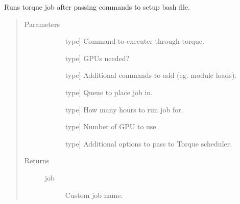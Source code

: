 \documentclass[letterpaper,10pt,english]{sphinxmanual}
\begin{document}

\begin{fulllineitems}
\label{\detokenize{index:methylnet.torque_jobs.assemble_run_torque}}
Runs torque job after passing commands to setup bash file.
\begin{quote}\begin{description}
\item[{Parameters}] \leavevmode\begin{description}
\item[{}] \leavevmode{[}type{]}
Command to executer through torque.

\item[{}] \leavevmode{[}type{]}
GPUs needed?

\item[{}] \leavevmode{[}type{]}
Additional commands to add (eg. module loads).

\item[{}] \leavevmode{[}type{]}
Queue to place job in.

\item[{}] \leavevmode{[}type{]}
How many hours to run job for.

\item[{}] \leavevmode{[}type{]}
Number of GPU to use.

\item[{}] \leavevmode{[}type{]}
Additional options to pass to Torque scheduler.

\end{description}

\item[{Returns}] \leavevmode\begin{description}
\item[{job}] \leavevmode
Custom job name.

\end{description}

\end{description}\end{quote}

\end{fulllineitems}
\end{document}
